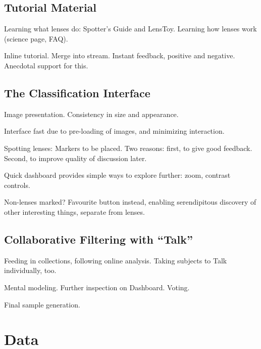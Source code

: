 \documentclass[useAMS,usenatbib,a4paper]{mn2e}
\begin{document}

\subsection{Tutorial Material}
\label{sec:design:tutorial}

Learning what lenses do: Spotter's Guide and LensToy. Learning how
lenses work (science page, FAQ). 

Inline tutorial. Merge into stream. Instant feedback, positive and
negative. Anecdotal support for this.



\subsection{The Classification Interface}
\label{sec:design:classification}

Image presentation. Consistency in size and appearance. 

Interface fast due to pre-loading of images, and minimizing interaction.

Spotting lenses: Markers to be placed. Two reasons: first, to give good
feedback. Second, to improve quality of discussion later.

Quick dashboard provides simple ways to explore further: zoom, contrast
controls.

Non-lenses marked? Favourite button instead, enabling serendipitous
discovery of other interesting things, separate from lenses.



\subsection{Collaborative Filtering with ``Talk''}
\label{sec:design:classification}

Feeding in collections, following online analysis. 
Taking subjects to Talk individually, too.

Mental modeling. Further inspection on Dashboard. Voting. 

Final sample generation.



\section{Data}
\label{sec:data}
\end{document}
